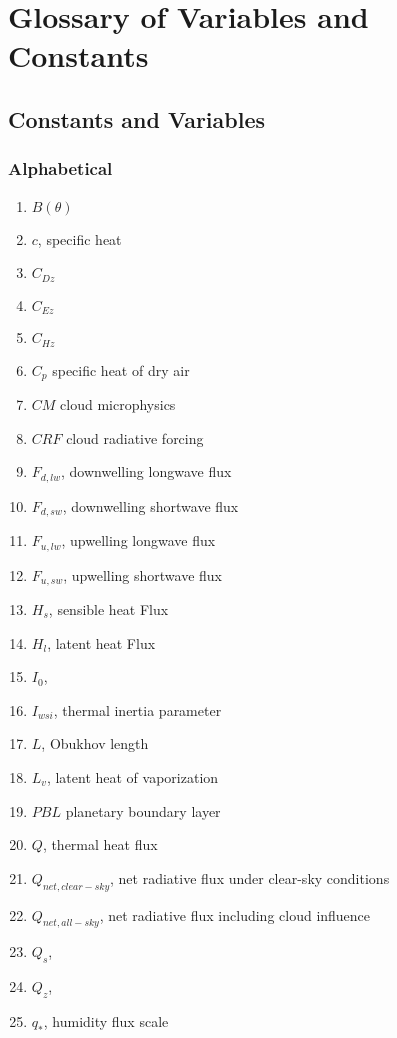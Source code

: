 \chapter{Glossary of Variables and Constants}
\section{Constants and Variables}
\subsection{Alphabetical}

\begin{enumerate}
    \item[]$B(\theta)$
    \item[]$c$, specific heat
    \item[]$C_{Dz}$
    \item[]$C_{Ez}$
    \item[]$C_{Hz}$ 
    \item[]$C_{p}$ specific heat of dry air
    \item[]$CM$ cloud microphysics
    \item[]$CRF$ cloud radiative forcing
    \item[]$F_{d,lw}$, downwelling longwave flux
    \item[]$F_{d,sw}$, downwelling shortwave flux
    \item[]$F_{u,lw}$, upwelling longwave flux
    \item[]$F_{u,sw}$, upwelling shortwave flux
    \item[]$H_{s}$, sensible heat Flux
    \item[]$H_{l}$, latent heat Flux
    \item[]$I_{0}$,
    \item[]$I_{wsi}$, thermal inertia parameter
    \item[]$L$, Obukhov length
    \item[]$L_{v}$, latent heat of vaporization
    \item[]$PBL$ planetary boundary layer
    \item[]$Q$, thermal heat flux
    \item[]$Q_{net, clear-sky}$, net radiative flux under clear-sky conditions
    \item[]$Q_{net, all-sky}$, net radiative flux including cloud influence
    \item[]$Q_{s}$,
    \item[]$Q_{z}$,
    \item[]$q_{*}$, humidity flux scale

\end{enumerate}
